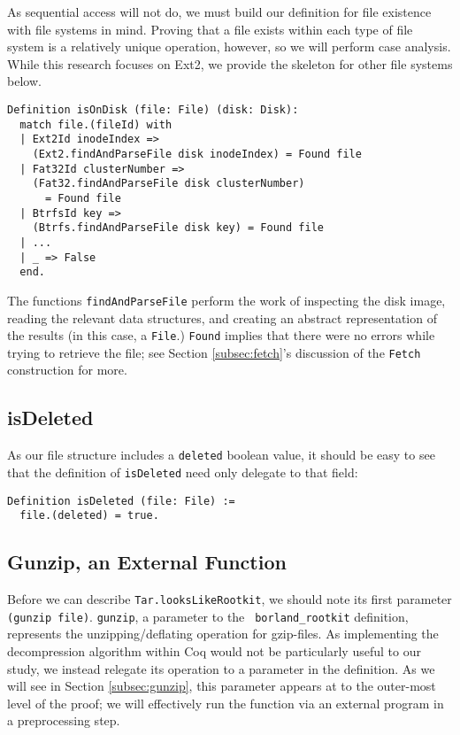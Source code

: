 \documentclass[nocopyrightspace,preprint]{sigplanconf}
\begin{document}
As sequential access will not do, we must build our definition for file
existence with file systems in mind. Proving that a file exists within each
type of file system is a relatively unique operation, however, so we will
perform case analysis. While this research focuses on Ext2, we provide the
skeleton for other file systems below.

\begin{lstlisting}
Definition isOnDisk (file: File) (disk: Disk):
  match file.(fileId) with
  | Ext2Id inodeIndex =>
    (Ext2.findAndParseFile disk inodeIndex) = Found file
  | Fat32Id clusterNumber =>
    (Fat32.findAndParseFile disk clusterNumber)
      = Found file
  | BtrfsId key =>
    (Btrfs.findAndParseFile disk key) = Found file
  | ...
  | _ => False
  end.
\end{lstlisting}

The functions {\tt findAndParseFile} perform the work of inspecting the disk
image, reading the relevant data structures, and creating an abstract
representation of the results (in this case, a {\tt File}.) {\tt Found}
implies that there were no errors while trying to retrieve the file; see
Section \ref{subsec:fetch}'s discussion of the {\tt Fetch} construction for
more.

\subsection{isDeleted}

As our file structure includes a {\tt deleted} boolean value, it should be
easy to see that the definition of {\tt isDeleted} need only delegate to that
field:

\begin{lstlisting}
Definition isDeleted (file: File) :=
  file.(deleted) = true.
\end{lstlisting}

\subsection{Gunzip, an External Function}

Before we can describe {\tt Tar.looksLikeRootkit}, we should note its first
parameter {\tt (gunzip file)}. {\tt gunzip}, a parameter to the {\tt
borland\_rootkit} definition, represents the unzipping/deflating operation for
gzip-files. As implementing the decompression algorithm within Coq would not
be particularly useful to our study, we instead relegate its operation to a
parameter in the definition. As we will see in Section \ref{subsec:gunzip},
this parameter appears at to the outer-most level of the proof; we will
effectively run the function via an external program in a preprocessing step.
\end{document}
